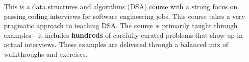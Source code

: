 
This is a data structures and algorithms (DSA) course with a strong focus on passing coding interviews for software engineering jobs. This course takes a very pragmatic approach to teaching DSA. The course is primarily taught through examples - it includes \textbf{hundreds} of carefully curated problems that show up in actual interviews. These examples are delivered through a balanced mix of walkthroughs and exercises.